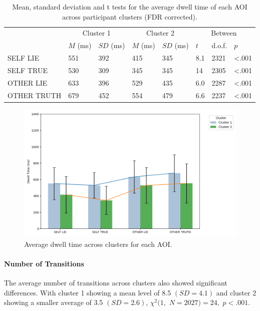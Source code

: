 \documentclass[man, floatsintext]{apa7}
\begin{document}
\begin{table}[H]
	\centering
	\begin{tabular}{|p{1.4cm}|p{1cm}|p{1cm}|p{1cm}|p{1cm}|p{1cm}|p{1cm}|p{1cm}|}
			\hline
			\multirow{2}{*}{} & \multicolumn{2}{c|}{Cluster 1} & \multicolumn{2}{c|}{Cluster 2} & \multicolumn{3}{c|}{Between} \\ \cline{2-8}
			& $M$ (ms) &$SD$ (ms) & $M$ (ms) & $SD$ (ms)  & $t$ & d.o.f. & $p$   \\ \hline
			\small{SELF LIE}& 551 & 392 & 415 & 345 & 8.1 & 2321 & <.001  \\ \hline
			\small{SELF TRUE} & 530 & 309 & 345 & 345& 14 & 2305  &  <.001 \\ \hline
			\small{OTHER LIE} & 633 & 396 &529 & 435 & 6.0 & 2287 &  <.001  \\ \hline
			\small{OTHER TRUTH} & 679 & 452 & 554 & 479 & 6.6 & 2237 &  <.001 \\ \hline
		\end{tabular}
	\vspace{0.3cm}
	\caption{Mean, standard deviation and t tests for the average dwell time of each AOI across participant clusters (FDR corrected).}
	\label{tab:DwellTimesPerCluster}
\end{table}

\begin{figure}[H]
	\centering
	\includegraphics[width=0.75\linewidth]{../plots/ALLTRIAL/DwellTimes.png}
	\caption{Average dwell time across clusters for each AOI.}
	\label{fig:DwellTimesPerCluster}
\end{figure}

\paragraph{Number of Transitions}

The average number of transitions across clusters also showed significant differences. With cluster 1 showing a mean level of 8.5 $(SD = 4.1)$ and cluster 2 showing a smaller average of 3.5 $(SD = 2.6)$, $\chi^2(1,$ $N=2027) = 24,$ $p<.001$.
\end{document}
